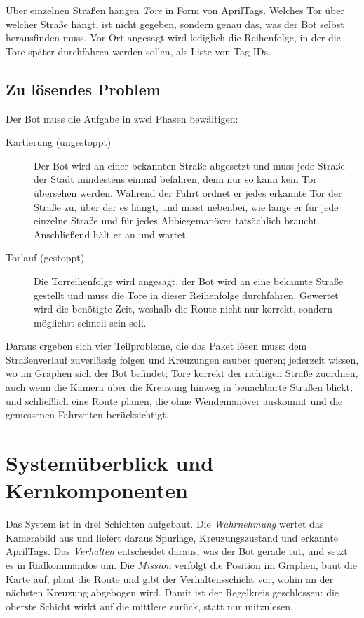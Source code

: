 \documentclass[10pt,a4paper]{article}
\begin{document}
Über einzelnen Straßen hängen \emph{Tore} in Form von AprilTags. Welches Tor
über welcher Straße hängt, ist nicht gegeben, sondern genau das, was der Bot
selbst herausfinden muss. Vor Ort angesagt wird lediglich die Reihenfolge, in
der die Tore später durchfahren werden sollen, als Liste von Tag IDs.

\subsection{Zu lösendes Problem}

Der Bot muss die Aufgabe in zwei Phasen bewältigen:

\begin{description}
  \item[Kartierung (ungestoppt)] Der Bot wird an einer bekannten Straße
    abgesetzt und muss jede Straße der Stadt mindestens einmal befahren, denn
    nur so kann kein Tor übersehen werden. Während der Fahrt ordnet er jedes
    erkannte Tor der Straße zu, über der es hängt, und misst nebenbei, wie
    lange er für jede einzelne Straße und für jedes Abbiegemanöver tatsächlich
    braucht. Anschließend hält er an und wartet.
  \item[Torlauf (gestoppt)] Die Torreihenfolge wird angesagt, der Bot wird an
    eine bekannte Straße gestellt und muss die Tore in dieser Reihenfolge
    durchfahren. Gewertet wird die benötigte Zeit, weshalb die Route nicht nur
    korrekt, sondern möglichst schnell sein soll.
\end{description}

Daraus ergeben sich vier Teilprobleme, die das Paket lösen muss: dem
Straßenverlauf zuverlässig folgen und Kreuzungen sauber queren; jederzeit
wissen, wo im Graphen sich der Bot befindet; Tore korrekt der richtigen Straße
zuordnen, auch wenn die Kamera über die Kreuzung hinweg in benachbarte Straßen
blickt; und schließlich eine Route planen, die ohne Wendemanöver auskommt und
die gemessenen Fahrzeiten berücksichtigt.

\section{Systemüberblick und Kernkomponenten}

Das System ist in drei Schichten aufgebaut. Die \emph{Wahrnehmung} wertet das
Kamerabild aus und liefert daraus Spurlage, Kreuzungszustand und erkannte
AprilTags. Das \emph{Verhalten} entscheidet daraus, was der Bot gerade tut, und
setzt es in Radkommandos um. Die \emph{Mission} verfolgt die Position im
Graphen, baut die Karte auf, plant die Route und gibt der Verhaltensschicht
vor, wohin an der nächsten Kreuzung abgebogen wird. Damit ist der Regelkreis
geschlossen: die oberste Schicht wirkt auf die mittlere zurück, statt nur
mitzulesen.
\end{document}
